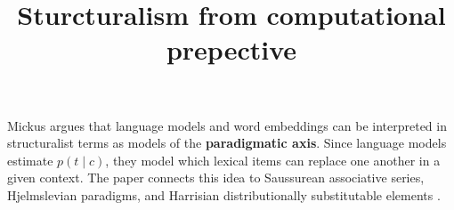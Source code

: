 \documentclass[a4paper]{article}
\title{Sturcturalism from computational prepective}
\date{}
\begin{document}
    \maketitle
    \cite{mickus-2024-language-models-and-the-paradigmatic-axis} Mickus argues that language models and word embeddings can be interpreted in structuralist terms as models of the \textbf{paradigmatic axis}. Since language models estimate \(p(t \mid c)\), they model which lexical items can replace one another in a given context. The paper connects this idea to Saussurean associative series, Hjelmslevian paradigms, and Harrisian distributionally substitutable elements \cite{mickus-2024-language-models-and-the-paradigmatic-axis}.
    
    
\end{document}
